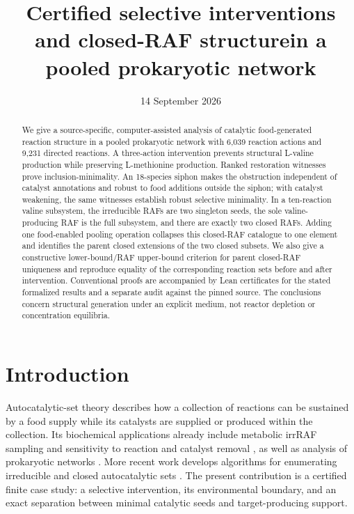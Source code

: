 \documentclass[11pt]{article}
\title{Certified selective interventions and closed-RAF structure\newline in a pooled prokaryotic network}
\author{}
\date{14 September 2026}
\theoremstyle{definition}\newtheorem{definition}[theorem]{Definition}
\begin{document}
\maketitle
\vspace{-1.3em}
\begin{abstract}
We give a source-specific, computer-assisted analysis of catalytic food-generated reaction structure in a pooled prokaryotic network with 6,039 reaction actions and 9,231 directed reactions. A three-action intervention prevents structural L-valine production while preserving L-methionine production. Ranked restoration witnesses prove inclusion-minimality. An 18-species siphon makes the obstruction independent of catalyst annotations and robust to food additions outside the siphon; with catalyst weakening, the same witnesses establish robust selective minimality. In a ten-reaction valine subsystem, the irreducible RAFs are two singleton seeds, the sole valine-producing RAF is the full subsystem, and there are exactly two closed RAFs. Adding one food-enabled pooling operation collapses this closed-RAF catalogue to one element and identifies the parent closed extensions of the two closed subsets. We also give a constructive lower-bound/RAF upper-bound criterion for parent closed-RAF uniqueness and reproduce equality of the corresponding reaction sets before and after intervention. Conventional proofs are accompanied by Lean certificates for the stated formalized results and a separate audit against the pinned source. The conclusions concern structural generation under an explicit medium, not reactor depletion or concentration equilibria.
\end{abstract}

\section{Introduction}
Autocatalytic-set theory describes how a collection of reactions can be sustained by a food supply while its catalysts are supplied or produced within the collection. Its biochemical applications already include metabolic irrRAF sampling and sensitivity to reaction and catalyst removal \cite{sousa2015}, as well as analysis of prokaryotic networks \cite{xavier2020,steel2020}. More recent work develops algorithms for enumerating irreducible and closed autocatalytic sets \cite{hordijk2026}. The present contribution is a certified finite case study: a selective intervention, its environmental boundary, and an exact separation between minimal catalytic seeds and target-producing support.
\end{document}
